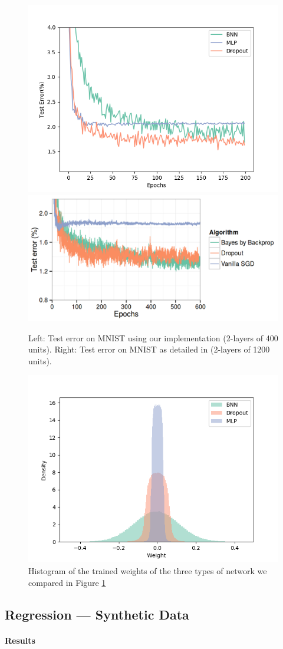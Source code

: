 \documentclass[11pt]{article}
\begin{document}
\begin{figure}
  \centering\includegraphics[width=.45\textwidth]{figures/test_error_compare.png}
  \centering\includegraphics[width=.45\textwidth]{figures/test_error_compare_paper.png}
  \caption{Left: Test error on MNIST using our implementation (2-layers of 400 units).
  Right: Test error on MNIST as detailed in \cite{blarg} (2-layers of 1200 units).}
  \label{fig:mnist_test_error}
\end{figure}

\begin{figure}
  \centering\includegraphics[width=.6\textwidth]{figures/weight_density_compare.png}
  \caption{Histogram of the trained weights of the three types of network we
  compared in Figure \ref{fig:mnist_test_error}}
  \label{fig:mnist_weight_density}
\end{figure}

\subsection{Regression --- Synthetic Data}
\paragraph{Results}
\end{document}
